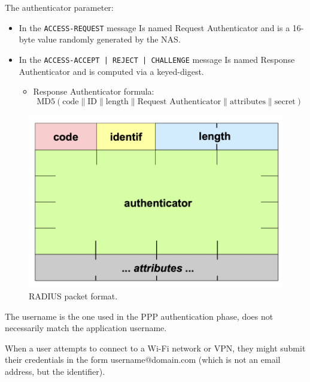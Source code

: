 The authenticator parameter:
\begin{itemize}
    \item In the \texttt{ACCESS-REQUEST} message Is named Request Authenticator and is a 16-byte value randomly generated by the NAS.
    \item In the \texttt{ACCESS-ACCEPT | REJECT | CHALLENGE} message Is named Response Authenticator and is computed via a keyed-digest.
    \begin{itemize}
        \item Response Authenticator formula:
        \begin{equation*}
            \text{MD5}(\text{code} \| \text{ID} \| \text{length} \|\text{Request Authenticator} \| \text{attributes} \| \text{secret})
        \end{equation*}
    \end{itemize}
\end{itemize}

\begin{figure}[H]
    \centering
    \includegraphics[width=0.5\linewidth]{Images/NetSec/radius_packet_format.png}
    \caption{RADIUS packet format.}
    
\end{figure}

\clearpage




\begin{tcolorbox}[colback=red!10!white, colframe=red!70!black, coltitle=white, title=Be aware] 
The username is the one used in the PPP authentication phase, does not necessarily match the application username.
\end{tcolorbox}
When a user attempts to connect to a Wi-Fi network or VPN, they might submit their credentials in the form username@domain.com (which is not an email address, but the identifier).



